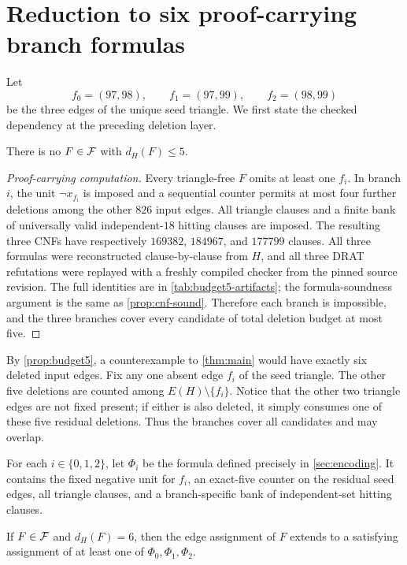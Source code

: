 \section{Reduction to six proof-carrying branch formulas}

Let
\[
 f_0=(97,98),\qquad f_1=(97,99),\qquad f_2=(98,99)
\]
be the three edges of the unique seed triangle.  We first state the checked
dependency at the preceding deletion layer.

\begin{proposition}\label{prop:budget5}
There is no \(F\in\mathcal F\) with \(d_H(F)\le5\).
\end{proposition}

\begin{proof}[Proof-carrying computation]
Every triangle-free \(F\) omits at least one \(f_i\).  In branch \(i\), the
unit \(\neg x_{f_i}\) is imposed and a sequential counter permits at most
four further deletions among the other \(826\) input edges.  All triangle
clauses and a finite bank of universally valid independent-\(18\) hitting
clauses are imposed.  The resulting three CNFs have respectively \(169382\),
\(184967\), and \(177799\) clauses.  All three formulas were reconstructed
clause-by-clause from \(H\), and all three DRAT refutations were replayed with
a freshly compiled checker from the pinned source revision.  The full
identities are in \cref{tab:budget5-artifacts}; the formula-soundness argument
is the same as \cref{prop:cnf-sound}.  Therefore each branch is impossible,
and the three branches cover every candidate of total deletion budget at most
five.
\end{proof}

By \cref{prop:budget5}, a counterexample to \cref{thm:main} would have exactly
six deleted input edges.  Fix any one absent edge \(f_i\) of the seed
triangle.  The other five deletions are counted among
\(E(H)\setminus\{f_i\}\).  Notice that the other two triangle edges are not
fixed present; if either is also deleted, it simply consumes one of these
five residual deletions.  Thus the branches cover all candidates and may
overlap.

For each \(i\in\{0,1,2\}\), let \(\Phi_i\) be the formula defined precisely in
\cref{sec:encoding}.  It contains the fixed negative unit for \(f_i\), an
exact-five counter on the residual seed edges, all triangle clauses, and a
branch-specific bank of independent-set hitting clauses.

\begin{lemma}\label{lem:cover}
If \(F\in\mathcal F\) and \(d_H(F)=6\), then the edge assignment of \(F\) extends to
a satisfying assignment of at least one of \(\Phi_0,\Phi_1,\Phi_2\).
\end{lemma}


